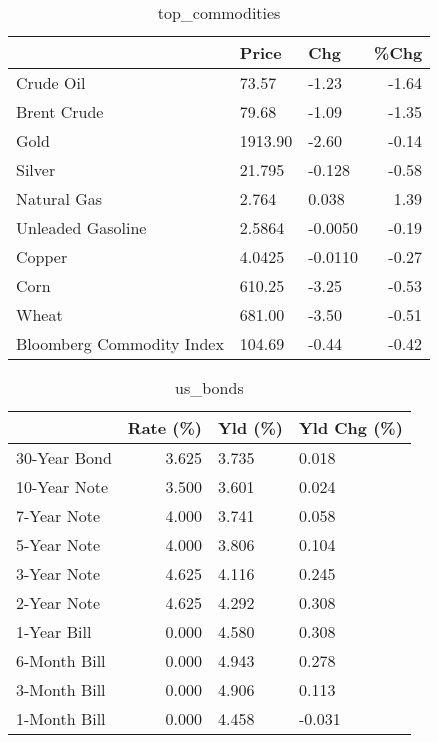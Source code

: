 \documentclass{article}%
\begin{document}
\begin{table}[htbp]%
\caption{top\_commodities}%
\centering%
\begin{adjustbox}{width=1\textwidth}%
\begin{tabular}{lllr}
\toprule
                          &   Price &     Chg &  \%Chg \\
\midrule
               Crude Oil  &   73.57 &   -1.23 & -1.64 \\
             Brent Crude  &   79.68 &   -1.09 & -1.35 \\
                    Gold  & 1913.90 &   -2.60 & -0.14 \\
                  Silver  &  21.795 &  -0.128 & -0.58 \\
             Natural Gas  &   2.764 &   0.038 &  1.39 \\
       Unleaded Gasoline  &  2.5864 & -0.0050 & -0.19 \\
                  Copper  &  4.0425 & -0.0110 & -0.27 \\
                    Corn  &  610.25 &   -3.25 & -0.53 \\
                   Wheat  &  681.00 &   -3.50 & -0.51 \\
Bloomberg Commodity Index &  104.69 &   -0.44 & -0.42 \\
\bottomrule
\end{tabular}
%
\end{adjustbox}%
\end{table}

%


\begin{table}[htbp]%
\caption{us\_bonds}%
\centering%
\begin{adjustbox}{width=1\textwidth}%
\begin{tabular}{lrll}
\toprule
             &  Rate (\%) & Yld (\%) & Yld Chg (\%) \\
\midrule
30-Year Bond &     3.625 &   3.735 &       0.018 \\
10-Year Note &     3.500 &   3.601 &       0.024 \\
 7-Year Note &     4.000 &   3.741 &       0.058 \\
 5-Year Note &     4.000 &   3.806 &       0.104 \\
 3-Year Note &     4.625 &   4.116 &       0.245 \\
 2-Year Note &     4.625 &   4.292 &       0.308 \\
 1-Year Bill &     0.000 &   4.580 &       0.308 \\
6-Month Bill &     0.000 &   4.943 &       0.278 \\
3-Month Bill &     0.000 &   4.906 &       0.113 \\
1-Month Bill &     0.000 &   4.458 &      -0.031 \\
\bottomrule
\end{tabular}
%
\end{adjustbox}%
\end{table}
\end{document}
